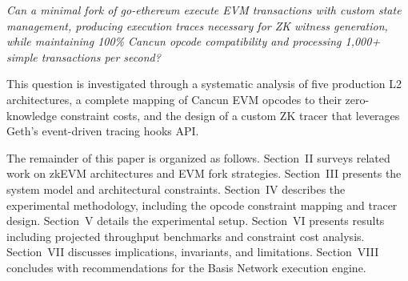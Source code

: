 \medskip
\noindent\textit{Can a minimal fork of go-ethereum execute EVM transactions with
custom state management, producing execution traces necessary for ZK witness
generation, while maintaining 100\% Cancun opcode compatibility and processing
1{,}000+ simple transactions per second?}
\medskip

This question is investigated through a systematic analysis of five production
L2 architectures, a complete mapping of Cancun EVM opcodes to their
zero-knowledge constraint costs, and the design of a custom ZK tracer
that leverages Geth's event-driven tracing hooks API.

The remainder of this paper is organized as follows. Section~II surveys related
work on zkEVM architectures and EVM fork strategies. Section~III presents the
system model and architectural constraints. Section~IV describes the
experimental methodology, including the opcode constraint mapping and tracer
design. Section~V details the experimental setup. Section~VI presents results
including projected throughput benchmarks and constraint cost analysis.
Section~VII discusses implications, invariants, and limitations. Section~VIII
concludes with recommendations for the Basis Network execution engine.
